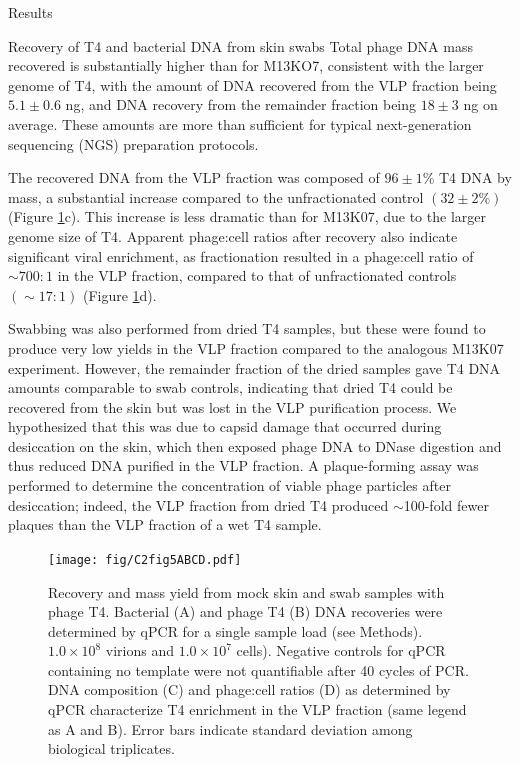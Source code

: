 \documentclass[oneside,12pt,final]{sty/ucthesis-CA2012}
\begin{document}
\begin{mainmatter}
\begin{section}{Results}
\begin{subsection}{Recovery of T4 and bacterial DNA from skin swabs}
Total phage DNA mass recovered is substantially higher than for M13KO7, consistent with the larger genome of T4, with the amount of DNA recovered from the VLP fraction being $5.1 \pm 0.6$ ng, and DNA recovery from the remainder fraction being $18 \pm 3$ ng on average. These amounts are more than sufficient for typical next-generation sequencing (NGS) preparation protocols.

The recovered DNA from the VLP fraction was composed of $96 \pm 1$\% T4 DNA by mass, a substantial increase compared to the unfractionated control $(32 \pm 2\%)$ (Figure \ref{fig:T4rec}c). This increase is less dramatic than for M13K07, due to the larger genome size of T4. Apparent phage:cell ratios after recovery also indicate significant viral enrichment, as fractionation resulted in a phage:cell
ratio of $\sim 700:1$ in the VLP fraction, compared to that of unfractionated controls $(\sim 17:1)$ (Figure \ref{fig:T4rec}d).

Swabbing was also performed from dried T4 samples, but these were found to produce very low yields in the VLP fraction compared to the analogous M13K07 experiment. However, the remainder fraction of the dried samples gave T4 DNA amounts comparable to swab controls, indicating that dried T4 could be recovered from the skin but was lost in the VLP purification process. We hypothesized that this was due to capsid damage that occurred during desiccation on the skin, which then exposed phage DNA to DNase digestion and thus reduced DNA purified in the VLP fraction. A plaque-forming assay was performed to determine the concentration of viable phage particles after desiccation; indeed, the VLP fraction from dried T4 produced $\sim$100-fold fewer plaques than the VLP fraction of a wet T4 sample.

\begin{figure}
\centering
\texttt{[image: fig/C2fig5ABCD.pdf]}
\caption{Recovery and mass yield from mock skin and swab samples with phage T4. Bacterial (A) and phage T4 (B) DNA recoveries were determined by qPCR for a single sample load (see Methods). $1.0 \times 10^{8}$ virions and $1.0 \times 10^{7}$ cells). Negative controls for qPCR containing no template were not quantifiable after 40 cycles of PCR. DNA composition (C) and phage:cell ratios (D) as determined by qPCR characterize T4 enrichment in the VLP fraction (same legend as A and B). Error bars indicate standard deviation among biological triplicates.}
\label{fig:T4rec}
\end{figure}
\end{subsection}


\end{section}
\end{mainmatter}
\end{document}
